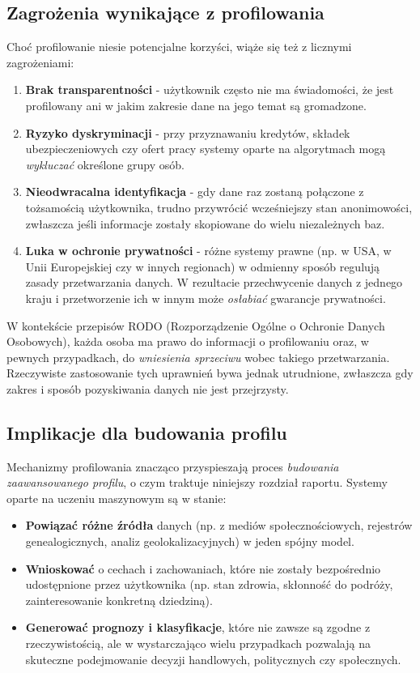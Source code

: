 \subsection{Zagrożenia wynikające z profilowania}
Choć profilowanie niesie potencjalne korzyści, wiąże się też z licznymi zagrożeniami:
\begin{enumerate}
    \item \textbf{Brak transparentności} - użytkownik często nie ma świadomości, że jest profilowany ani w jakim zakresie dane na jego temat są gromadzone.
    \item \textbf{Ryzyko dyskryminacji} - przy przyznawaniu kredytów, składek ubezpieczeniowych czy ofert pracy systemy oparte na algorytmach mogą \emph{wykluczać} określone grupy osób.
    \item \textbf{Nieodwracalna identyfikacja} - gdy dane raz zostaną połączone z tożsamością użytkownika, trudno przywrócić wcześniejszy stan anonimowości, zwłaszcza jeśli informacje zostały skopiowane do wielu niezależnych baz.
    \item \textbf{Luka w ochronie prywatności} - różne systemy prawne (np. w USA, w Unii Europejskiej czy w innych regionach) w odmienny sposób regulują zasady przetwarzania danych. W rezultacie przechwycenie danych z jednego kraju i przetworzenie ich w innym może \emph{osłabiać} gwarancje prywatności.
\end{enumerate}

W kontekście przepisów RODO (Rozporządzenie Ogólne o Ochronie Danych Osobowych), każda osoba ma prawo do informacji o profilowaniu oraz, w pewnych przypadkach, do \emph{wniesienia sprzeciwu} wobec takiego przetwarzania. Rzeczywiste zastosowanie tych uprawnień bywa jednak utrudnione, zwłaszcza gdy zakres i sposób pozyskiwania danych nie jest przejrzysty.

\subsection{Implikacje dla budowania profilu}
Mechanizmy profilowania znacząco przyspieszają proces \emph{budowania zaawansowanego profilu}, o czym traktuje niniejszy rozdział raportu. Systemy oparte na uczeniu maszynowym są w stanie:
\begin{itemize}
    \item \textbf{Powiązać różne źródła} danych (np. z mediów społecznościowych, rejestrów genealogicznych, analiz geolokalizacyjnych) w jeden spójny model.
    \item \textbf{Wnioskować} o cechach i zachowaniach, które nie zostały bezpośrednio udostępnione przez użytkownika (np. stan zdrowia, skłonność do podróży, zainteresowanie konkretną dziedziną).
    \item \textbf{Generować prognozy i klasyfikacje}, które nie zawsze są zgodne z rzeczywistością, ale w wystarczająco wielu przypadkach pozwalają na skuteczne podejmowanie decyzji handlowych, politycznych czy społecznych.
\end{itemize}

